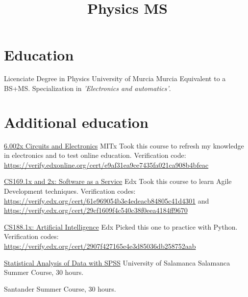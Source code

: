 \documentclass[11pt,a4paper,sans]{moderncv}
\title{Physics MS}
\begin{document}
\maketitle

\section{Education}

{Licenciate Degree in Physics}
{University of Murcia}
{Murcia}{}
{Equivalent to a BS+MS. Specialization in \textit{'Electronics and automatics'}.}

\section{Additional education}

	{\href{https://6002x.mitx.mit.edu/}
{6.002x Circuits and Electronics}}
{MITx}{}{}
{Took this course to refresh my knowledge in electronics and to test online education. Verification code: \newline{} \url{https://verify.edxonline.org/cert/e9af31ea9ce7435fa021ca908b4bfeac}}

{\href{https://6002x.mitx.mit.edu/}{CS169.1x and 2x: Software as a Service}}
{Edx}{}{}
{Took this course to learn Agile Development techniques. 
Verification codes: \newline{} \url{https://verify.edx.org/cert/61e969054b3e4edeacb84805c41d4301} and \newline{} \url{https://verify.edx.org/cert/29cf1609f4c540c38f0eea4184ff9670}}

{\href{https://6002x.mitx.mit.edu/}{CS188.1x: Artificial Intelligence}}
{Edx}{}{}
{Picked this one to practice with Python. 
Verification codes: \newline{} \url{https://verify.edx.org/cert/2907f427165e4e3d85036db258752aab}}


{\href{http://biplot.usal.es/verano/analisis-estadistico-de-dat.html}
{Statistical Analysis of Data with SPSS}}
{University of Salamanca}
{Salamanca}
{}
{Summer Course, 30 hours.}

{Santander}
{}
{Summer Course, 30 hours.}
\end{document}
